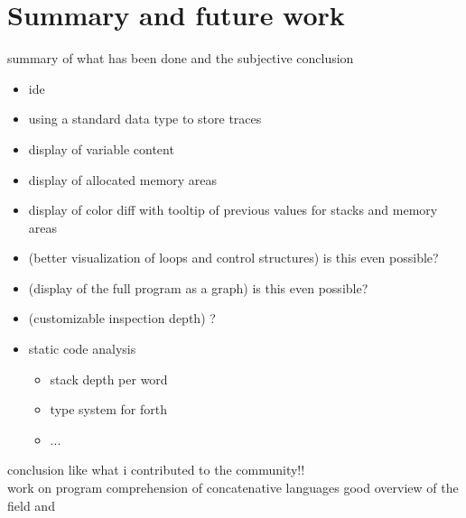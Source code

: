 \chapter{Summary and future work}

summary of what has been done and the subjective conclusion

\begin{itemize}
\item ide
\item using a standard data type to store traces
\item display of variable content
\item display of allocated memory areas
\item display of color diff with tooltip of previous values for stacks and memory areas
\item (better visualization of loops and control structures) is this even possible?
\item (display of the full program as a graph) is this even possible?
\item (customizable inspection depth) ?
\item static code analysis
\begin{itemize}
\item stack depth per word
\item type system for forth
\item ...
\end{itemize}
\end{itemize}


conclusion like what i contributed to the community!!\\

work on program comprehension of concatenative languages
good overview of the field \cite{Canfora:2011:ACS:1924421.1924451} and \cite{Cornelissen2009}